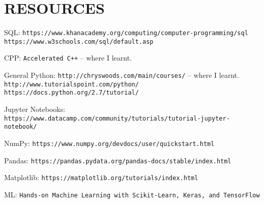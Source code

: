 \section{RESOURCES}

SQL:
\newline
\texttt{https://www.khanacademy.org/computing/computer-programming/sql}
\newline
\texttt{https://www.w3schools.com/sql/default.asp}

CPP:
\newline
\texttt{Accelerated C++} -- where I learnt.

General Python:
\newline
\texttt{http://chryswoods.com/main/courses/} -- where I learnt.
\newline
\texttt{http://www.tutorialspoint.com/python/}
\newline
\texttt{https://docs.python.org/2.7/tutorial/}

Jupyter Notebooks:
\newline
\texttt{https://www.datacamp.com/community/tutorials/tutorial-jupyter-notebook/}

NumPy:
\newline
\texttt{https://www.numpy.org/devdocs/user/quickstart.html}

Pandas:
\newline
\texttt{https://pandas.pydata.org/pandas-docs/stable/index.html}

Matplotlib:
\newline
\texttt{https://matplotlib.org/tutorials/index.html}

ML:
\newline
\texttt{Hands-on Machine Learning with Scikit-Learn, Keras, and TensorFlow}


\newpage